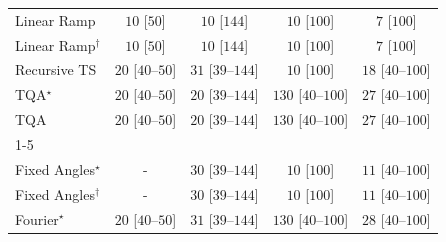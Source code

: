 \begin{tabular}{l|cccc|}
Linear Ramp & {\cellcolor[HTML]{F7FCF5}} \color[HTML]{000000} $10$ [$50$] & {\cellcolor[HTML]{F7FCF5}} \color[HTML]{000000} $10$ [$144$] & {\cellcolor[HTML]{F7FCF5}} \color[HTML]{000000} $10$ [$100$] & {\cellcolor[HTML]{F7FCF5}} \color[HTML]{000000} $7$ [$100$] \\
Linear Ramp$^\dagger$ & {\cellcolor[HTML]{F7FCF5}} \color[HTML]{000000} $10$ [$50$] & {\cellcolor[HTML]{F7FCF5}} \color[HTML]{000000} $10$ [$144$] & {\cellcolor[HTML]{F7FCF5}} \color[HTML]{000000} $10$ [$100$] & {\cellcolor[HTML]{F7FCF5}} \color[HTML]{000000} $7$ [$100$] \\
Recursive TS & {\cellcolor[HTML]{F5FBF2}} \color[HTML]{000000} $20$ [$40$--$50$] & {\cellcolor[HTML]{F3FAF0}} \color[HTML]{000000} $31$ [$39$--$144$] & {\cellcolor[HTML]{F7FCF5}} \color[HTML]{000000} $10$ [$100$] & {\cellcolor[HTML]{F5FBF3}} \color[HTML]{000000} $18$ [$40$--$100$] \\
TQA$^\star$ & {\cellcolor[HTML]{F5FBF2}} \color[HTML]{000000} $20$ [$40$--$50$] & {\cellcolor[HTML]{F5FBF2}} \color[HTML]{000000} $20$ [$39$--$144$] & {\cellcolor[HTML]{DDF2D8}} \color[HTML]{000000} $130$ [$40$--$100$] & {\cellcolor[HTML]{F4FBF1}} \color[HTML]{000000} $27$ [$40$--$100$] \\
TQA & {\cellcolor[HTML]{F5FBF2}} \color[HTML]{000000} $20$ [$40$--$50$] & {\cellcolor[HTML]{F5FBF2}} \color[HTML]{000000} $20$ [$39$--$144$] & {\cellcolor[HTML]{DDF2D8}} \color[HTML]{000000} $130$ [$40$--$100$] & {\cellcolor[HTML]{F4FBF1}} \color[HTML]{000000} $27$ [$40$--$100$] \\
\cline{1-5}
\multicolumn{5}{c}{\rule{0pt}{8pt}PP} \\
\midrule
Fixed Angles$^\star$ & {\cellcolor[HTML]{000000}} \color[HTML]{F1F1F1} {\cellcolor{white}} \color{black} - & {\cellcolor[HTML]{F3FAF0}} \color[HTML]{000000} $30$ [$39$--$144$] & {\cellcolor[HTML]{F7FCF5}} \color[HTML]{000000} $10$ [$100$] & {\cellcolor[HTML]{F6FCF4}} \color[HTML]{000000} $11$ [$40$--$100$] \\
Fixed Angles$^\dagger$ & {\cellcolor[HTML]{000000}} \color[HTML]{F1F1F1} {\cellcolor{white}} \color{black} - & {\cellcolor[HTML]{F3FAF0}} \color[HTML]{000000} $30$ [$39$--$144$] & {\cellcolor[HTML]{F7FCF5}} \color[HTML]{000000} $10$ [$100$] & {\cellcolor[HTML]{F6FCF4}} \color[HTML]{000000} $11$ [$40$--$100$] \\
Fourier$^\star$ & {\cellcolor[HTML]{F5FBF2}} \color[HTML]{000000} $20$ [$40$--$50$] & {\cellcolor[HTML]{F3FAF0}} \color[HTML]{000000} $31$ [$39$--$144$] & {\cellcolor[HTML]{DDF2D8}} \color[HTML]{000000} $130$ [$40$--$100$] & {\cellcolor[HTML]{F4FBF1}} \color[HTML]{000000} $28$ [$40$--$100$] \\

\end{tabular}
